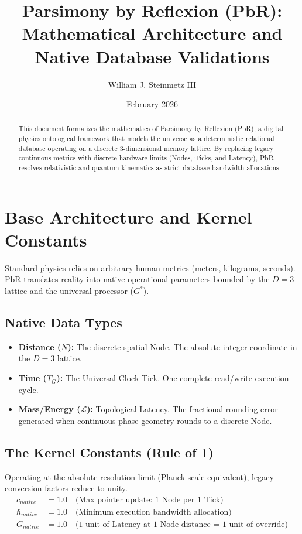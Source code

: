 \documentclass[12pt, a4paper]{article}
\title{\textbf{Parsimony by Reflexion (PbR):}\\ Mathematical Architecture and Native Database Validations}
\author{William J. Steinmetz III}
\date{February 2026}
\begin{document}
\maketitle
\begin{abstract}
This document formalizes the mathematics of Parsimony by Reflexion (PbR), a digital physics ontological framework that models the universe as a deterministic relational database operating on a discrete 3-dimensional memory lattice. By replacing legacy continuous metrics with discrete hardware limits (Nodes, Ticks, and Latency), PbR resolves relativistic and quantum kinematics as strict database bandwidth allocations.
\end{abstract}
\section{Base Architecture and Kernel Constants}
Standard physics relies on arbitrary human metrics (meters, kilograms, seconds). PbR translates reality into native operational parameters bounded by the $D=3$ lattice and the universal processor ($G^*$).
\subsection{Native Data Types}
\begin{itemize}
    \item \textbf{Distance ($N$):} The discrete spatial Node. The absolute integer coordinate in the $D=3$ lattice.
    \item \textbf{Time ($T_G$):} The Universal Clock Tick. One complete read/write execution cycle.
    \item \textbf{Mass/Energy ($\mathcal{L}$):} Topological Latency. The fractional rounding error generated when continuous phase geometry rounds to a discrete Node.
\end{itemize}
\subsection{The Kernel Constants (Rule of 1)}
Operating at the absolute resolution limit (Planck-scale equivalent), legacy conversion factors reduce to unity.
\begin{align}
    c_{native} &= 1.0 \quad \text{(Max pointer update: 1 Node per 1 Tick)} \\
    \hbar_{native} &= 1.0 \quad \text{(Minimum execution bandwidth allocation)} \\
    G_{native} &= 1.0 \quad \text{(1 unit of Latency at 1 Node distance = 1 unit of override)}
\end{align}
\end{document}
